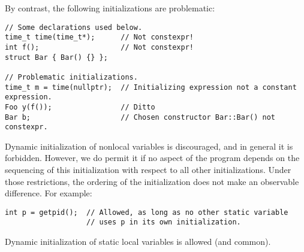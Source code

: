     By contrast, the following initializations are problematic:
\begin{verbatim}
// Some declarations used below.
time_t time(time_t*);      // Not constexpr!
int f();                   // Not constexpr!
struct Bar { Bar() {} };

// Problematic initializations.
time_t m = time(nullptr);  // Initializing expression not a constant expression.
Foo y(f());                // Ditto
Bar b;                     // Chosen constructor Bar::Bar() not constexpr.
    \end{verbatim}
    Dynamic initialization of nonlocal variables is discouraged, and in general it is forbidden. However, we do permit it if no aspect of the program depends on the sequencing of this initialization with respect to all other initializations. Under those restrictions, the ordering of the initialization does not make an observable difference. For example:
\begin{verbatim}
int p = getpid();  // Allowed, as long as no other static variable
                   // uses p in its own initialization.
    \end{verbatim}
    Dynamic initialization of static local variables is allowed (and common).

